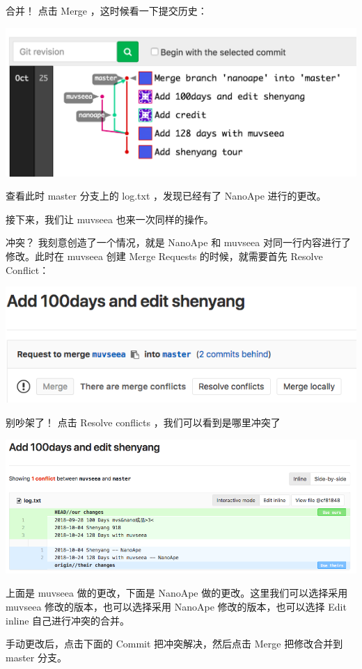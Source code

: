 \documentclass{beamer}
\begin{document}
\begin{frame}{合并！}
    点击 Merge ，这时候看一下提交历史：

    \includegraphics[width=\linewidth]{2018-10-25-16-54-11.png}

    查看此时 master 分支上的 log.txt ，发现已经有了 NanoApe 进行的更改。

    接下来，我们让 muvseea 也来一次同样的操作。
\end{frame}

\begin{frame}{冲突？}
    我刻意创造了一个情况，就是 NanoApe 和 muvseea 对同一行内容进行了修改。此时在 muvseea 创建 Merge Requests 的时候，就需要首先 Resolve Conflict：

    \includegraphics[width=\linewidth]{2018-10-25-16-56-59.png}
\end{frame}

\begin{frame}{别吵架了！}
    点击 Resolve conflicts ，我们可以看到是哪里冲突了

    \includegraphics[width=\linewidth]{2018-10-25-16-57-53.png}

    上面是 muvseea 做的更改，下面是 NanoApe 做的更改。这里我们可以选择采用 muvseea 修改的版本，也可以选择采用 NanoApe 修改的版本，也可以选择 Edit inline 自己进行冲突的合并。

    手动更改后，点击下面的 Commit 把冲突解决，然后点击 Merge 把修改合并到 master 分支。
\end{frame}
\end{document}
